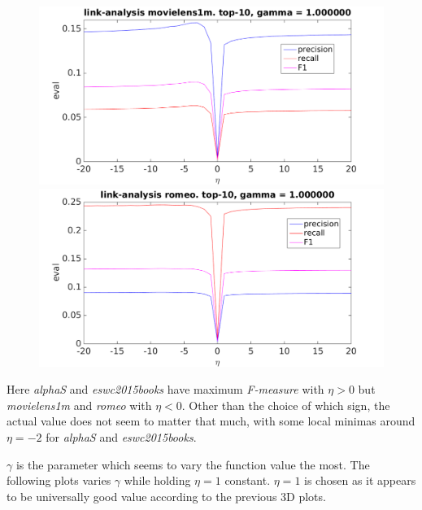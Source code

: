 \begin{figure}[h!]
\centering
\begin{minipage}{.5\textwidth}
    \centering
    \includegraphics[width=\linewidth]{fig/link_eta/movielens_link_eta.png}
\end{minipage}%
\begin{minipage}{.5\textwidth}
    \centering
    \includegraphics[width=\linewidth]{fig/link_eta/romeo_link_eta.png}
\end{minipage}
\end{figure}

\FloatBarrier

Here \textit{alphaS} and \textit{eswc2015books} have maximum \textit{F-measure} with $\eta > 0$ but \textit{movielens1m} and \textit{romeo} with $\eta < 0$. Other than the choice of which sign, the actual value does not seem to matter that much, with some local minimas around $\eta = -2$ for \textit{alphaS} and \textit{eswc2015books}.

\newpage

$\gamma$ is the parameter which seems to vary the function value the most. The following plots varies $\gamma$ while holding $\eta = 1$ constant. $\eta = 1$ is chosen as it appears to be universally good value according to the previous 3D plots.

